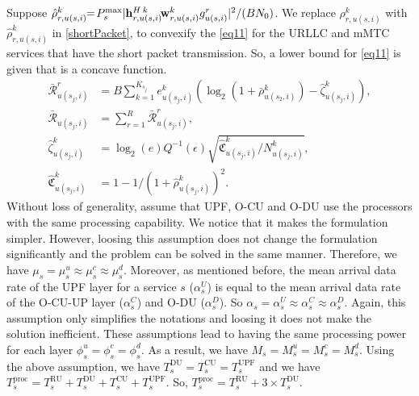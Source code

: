 \documentclass[lettersize,journal]{IEEEtran}
\begin{document}
Suppose $\hat{\rho}_{r,u(s,i)}^{k}\!\!=\!  P_{s}^{\text{max}}|{\bold{h}_{r,u(s,i)}^{H \: k}}\! \bold{w}_{r,u(s,i)}^{k} g_{u(s,i)}^r|^2/(BN_0)$.
We replace ${\rho}_{r,u(s,i)}^{k}$ with $\hat{\rho}_{r,u(s,i)}^{k}$ in \eqref{shortPacket}, to convexify the \eqref{eq11} for the URLLC and mMTC services that have the short packet transmission.
So, a lower bound for \eqref{eq11} is given that is a concave function.
\begin{subequations}\label{lb1}
\begin{alignat}{4}
\bar{\mathcal{R}}_{u(s_j,i)}^{r} &\!\!=\!\!B\! \sum_{k=1}^{K_{\!s_j}}\!\!{e}_{u(s_j,i)}^{k} (\log_2({\!1\!+\! \bar{\rho}_{u(s_2,i)}^{k}})\!-\! \hat{\zeta}_{u(s_j,i)}^{k}\!),\!\\
\bar{\mathcal{R}}_{u(s_j,i)} &\!\!= \sum_{r=1}^{R}\bar{\mathcal{R}}_{u(s_j,i)}^{r},\\
 \hat{\zeta}_{u(s_j,i)}^{k} &\!\!= \log_2({e})Q^{-1}(\epsilon) \sqrt{\hat{\mathfrak{C}}_{u(s_j,i)}^{k}/N_{u(s_j,i)}^{k}},\\
 \hat{\mathfrak{C}}_{u(s_j,i)}^{k} &\!\!= 1 - 1/(1+\hat{\rho}_{u(s_j,i)}^{k})^2.
\end{alignat}
\end{subequations}
Without loss of generality, assume that UPF, O-CU and O-DU use the processors with the same processing capability. We notice that it makes the formulation simpler. However, loosing this assumption does not change the formulation significantly and the problem can be solved in the same manner. Therefore, we have $\mu_s = \mu_s^u \approx \mu_s^c \approx \mu_s^d $. Moreover, as mentioned before,
the mean arrival data rate of the UPF layer for a service $s$ ($\alpha_{s}^U$) is equal to the mean arrival data rate of the O-CU-UP layer ($\alpha_{s}^C$) and O-DU ($\alpha_{s}^D$). So $\alpha_{s} =\alpha_{s}^U \approx \alpha_{s}^C \approx \alpha_{s}^D$. Again, this assumption only simplifies the notations and loosing it does not make the solution inefficient.
These assumptions lead to having the same processing power for each layer $\phi_s^u = \phi_s^c =\phi_s^d $.
As a result, we have $M_s = M_s^u = M_s^c = M_s^d $.
Using the above assumption, we have $T^{\text{DU}}_{s} = T^{\text{CU}}_{s} = T^{\text{UPF}}_{s}$ and we have
$T^{\text{proc}}_{s} =  T^{\text{RU}}_{s} + T^{\text{DU}}_{s} + T^{\text{CU}}_{s} + T^{\text{UPF}}_{s}$. So,
$T^{\text{proc}}_{s}=  T^{\text{RU}}_{s} + 3\times T^{\text{DU}}_{s}.$
\end{document}
